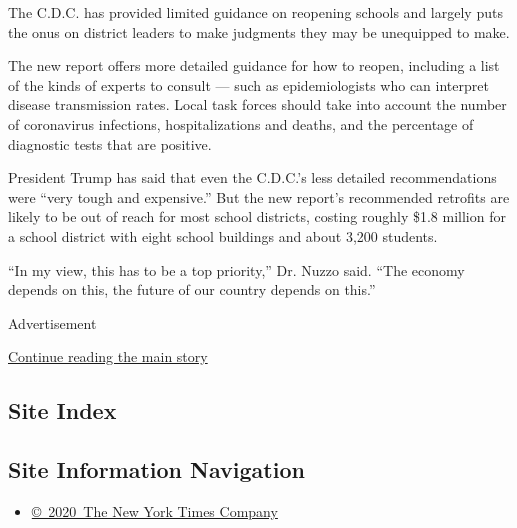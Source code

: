 The C.D.C. has provided limited guidance on reopening schools and
largely puts the onus on district leaders to make judgments they may be
unequipped to make.

The new report offers more detailed guidance for how to reopen,
including a list of the kinds of experts to consult --- such as
epidemiologists who can interpret disease transmission rates. Local task
forces should take into account the number of coronavirus infections,
hospitalizations and deaths, and the percentage of diagnostic tests that
are positive.

President Trump has said that even the C.D.C.'s less detailed
recommendations were ``very tough and expensive.'' But the new report's
recommended retrofits are likely to be out of reach for most school
districts, costing roughly \$1.8 million for a school district with
eight school buildings and about 3,200 students.

``In my view, this has to be a top priority,'' Dr. Nuzzo said. ``The
economy depends on this, the future of our country depends on this.''

Advertisement

\protect\hyperlink{after-bottom}{Continue reading the main story}

\hypertarget{site-index}{%
\subsection{Site Index}\label{site-index}}

\hypertarget{site-information-navigation}{%
\subsection{Site Information
Navigation}\label{site-information-navigation}}

\begin{itemize}
\tightlist
\item
  \href{https://help.nytimes.com/hc/en-us/articles/115014792127-Copyright-notice}{©~2020~The
  New York Times Company}
\end{itemize}

